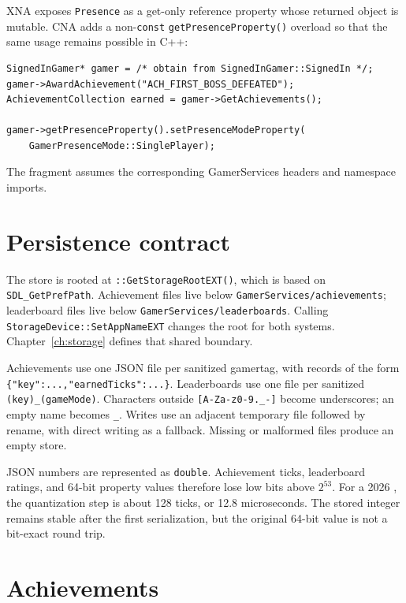 XNA exposes \texttt{Presence} as a get-only reference property whose returned object is
mutable. CNA adds a non-\texttt{const} \texttt{getPresenceProperty()} overload so that the same
usage remains possible in C++:

\begin{lstlisting}
SignedInGamer* gamer = /* obtain from SignedInGamer::SignedIn */;
gamer->AwardAchievement("ACH_FIRST_BOSS_DEFEATED");
AchievementCollection earned = gamer->GetAchievements();

gamer->getPresenceProperty().setPresenceModeProperty(
    GamerPresenceMode::SinglePlayer);
\end{lstlisting}

The fragment assumes the corresponding GamerServices headers and namespace imports.

\section{Persistence contract}

The store is rooted at \texttt{::GetStorageRootEXT()}, which is based
on \texttt{SDL\_GetPrefPath}. Achievement files live below
\texttt{GamerServices/achievements}; leaderboard files live below
\texttt{GamerServices/leaderboards}. Calling
\texttt{StorageDevice::SetAppNameEXT} changes the root for both systems. Chapter~\ref{ch:storage}
defines that shared boundary.

Achievements use one JSON file per sanitized gamertag, with records of the form
\texttt{\{"key":...,"earnedTicks":...\}}. Leaderboards use one file per sanitized
\texttt{(key)\_(gameMode)}. Characters outside \texttt{[A-Za-z0-9.\_-]} become underscores;
an empty name becomes \texttt{\_}. Writes use an adjacent temporary file followed by rename,
with direct writing as a fallback. Missing or malformed files produce an empty store.

JSON numbers are represented as \texttt{double}. Achievement ticks, leaderboard ratings, and
64-bit property values therefore lose low bits above $2^{53}$. For a 2026
, the quantization step is about 128 ticks, or 12.8 microseconds. The stored
integer remains stable after the first serialization, but the original 64-bit value is not a
bit-exact round trip.

\section{Achievements}

